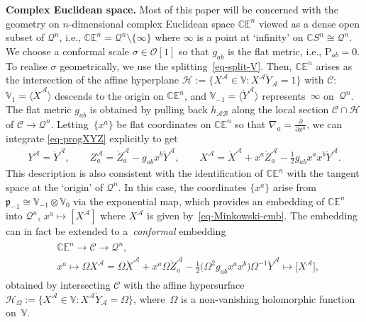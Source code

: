 \documentclass[10pt,a4paper]{amsart}
\numberwithin{equation}{section}
\newcommand{\parderv}[2] {\frac{\partial#1}{\partial#2}}
\newcommand{\mc} [1]{\mathcal{#1}}
\newcommand{\mr}[1] {\mathring{#1}}
\newcommand{\Rho} {\mathrm{P}}
\newcommand{\mfp} {\mathfrak{p}}
\newcommand{\E} {\mathbb{E}}
\newcommand{\C} {\mathbb{C}}
\newcommand{\V} {\mathbb{V}}
\begin{document}
{\bf Complex Euclidean space.} %
Most of this paper will be concerned with the geometry on $n$-dimensional complex Euclidean space $\C \E^n$ viewed as a dense open subset of $\mc{Q}^n$, i.e., $\C \E^n = \mc{Q}^n \setminus \{\infty\}$ where $\infty$ is a point at `inf\/inity' on $\C S^n \cong \mc{Q}^n$. We choose a conformal scale $\sigma \in \mc{O}[1]$ so that $g_{ab}$ is the f\/lat metric, i.e., $\Rho_{ab}=0$. To realise $\sigma$ geometrically, we use the splitting~\eqref{eq-split-V}. Then, $\C \E^n$ arises as the intersection of the af\/f\/ine hyperplane $\mc{H} := \{ X^\mc{A} \in \V \colon X^\mc{A} \mr{Y}_\mc{A} = 1 \}$ with $\mc{C}$: $\V_1 = \langle \mr{X}^\mc{A} \rangle$ descends to the origin on $\C \E^n$, and $\V_{-1} = \langle \mr{Y}^\mc{A} \rangle$ represents~$\infty$ on~$\mc{Q}^n$. The f\/lat metric $g_{ab}$ is obtained by pulling back $h_{\mc{A} \mc{B}}$ along the local section $\mc{C} \cap \mc{H}$ of $\mc{C} \rightarrow \mc{Q}^n $. Let\-ting~$\{ x^a \}$ be f\/lat coordinates on $\C \E^n$ so that $\nabla_a = \parderv{}{x^a}$, we can integrate \eqref{eq-progXYZ} explicitly to get
\begin{gather}\label{eq-Minkowski-emb}
Y^\mc{A} = \mr{Y}^\mc{A} , \qquad Z^\mc{A}_a = \mr{Z}^\mc{A}_a - g_{ab} x^b \mr{Y}^\mc{A} , \qquad X^\mc{A} = \mr{X}^\mc{A} + x^a \mr{Z}^\mc{A}_a - \tfrac{1}{2} g_{ab} x^a x^b \mr{Y}^\mc{A} .
\end{gather}
This description is also consistent with the identif\/ication of $\C\E^n$ with the tangent space at the `origin' of $\mc{Q}^n$. In this case, the coordinates $\{ x^a \}$ arise from $\mfp_{-1} \cong \V_{-1} \otimes \V_0$ via the exponential map, which provides an embedding of $\C\E^n$ into $\mc{Q}^n$, $x^a \mapsto [ X^\mc{A}]$ where $X^\mc{A}$ is given by~\eqref{eq-Minkowski-emb}. The embedding can in fact be extended to a~\emph{conformal} embedding
\begin{gather*}
\begin{split}&
\C \E^n \rightarrow \mc{C} \rightarrow \mc{Q}^n , \\
& x^a \mapsto \Omega X^\mc{A} = \Omega \mr{X}^\mc{A} + x^a \Omega \mr{Z} _a^\mc{A} - \tfrac{1}{2} \big( \Omega^2 g_{ab} x^a x^b \big) \Omega^{-1} \mr{Y}^\mc{A} \mapsto \big[X^\mc{A}\big],
\end{split}
\end{gather*}
obtained by intersecting $\mc{C}$ with the af\/f\/ine hypersurface $\mc{H}_{\Omega} := \{ X^\mc{A} \in \V \colon X^\mc{A} \mr{Y}_\mc{A} = \Omega \}$, where~$\Omega$ is a non-vanishing holomorphic function on~$\V$.
\end{document}
